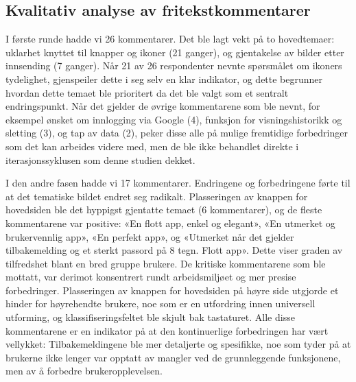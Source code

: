 \subsection{Kvalitativ analyse av fritekstkommentarer}
I første runde hadde vi 26 kommentarer. Det ble lagt vekt på to hovedtemaer: uklarhet knyttet til knapper og ikoner (21 ganger), og gjentakelse av bilder etter innsending (7 ganger). Når 21 av 26 respondenter nevnte spørsmålet om ikoners tydelighet, gjenspeiler dette i seg selv en klar indikator, og dette begrunner hvordan dette temaet ble prioritert da det ble valgt som et sentralt endringspunkt. Når det gjelder de øvrige kommentarene som ble nevnt, for eksempel ønsket om innlogging via Google (4), funksjon for visningshistorikk og sletting (3), og tap av data (2), peker disse alle på mulige fremtidige forbedringer som det kan arbeides videre med, men de ble ikke behandlet direkte i iterasjonssyklusen som denne studien dekket.

I den andre fasen hadde vi 17 kommentarer. Endringene og forbedringene førte til at det tematiske bildet endret seg radikalt. Plasseringen av knappen for hovedsiden ble det hyppigst gjentatte temaet (6 kommentarer), og de fleste kommentarene var positive: «En flott app, enkel og elegant», «En utmerket og brukervennlig app», «En perfekt app», og «Utmerket når det gjelder tilbakemelding og et sterkt passord på 8 tegn. Flott app». Dette viser graden av tilfredshet blant en bred gruppe brukere. De kritiske kommentarene som ble mottatt, var derimot konsentrert rundt arbeidsmiljøet og mer presise forbedringer. Plasseringen av knappen for hovedsiden på høyre side utgjorde et hinder for høyrehendte brukere, noe som er en utfordring innen universell utforming, og klassifiseringsfeltet ble skjult bak tastaturet. Alle disse kommentarene er en indikator på at den kontinuerlige forbedringen har vært vellykket: Tilbakemeldingene ble mer detaljerte og spesifikke, noe som tyder på at brukerne ikke lenger var opptatt av mangler ved de grunnleggende funksjonene, men av å forbedre brukeropplevelsen.

